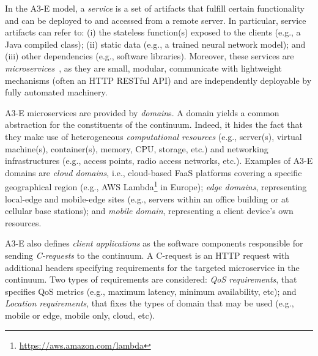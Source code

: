 In the A3-E model, a \textit{service} is a set of artifacts that fulfill certain functionality and can be deployed to and accessed from a remote server. In particular, service artifacts can refer to: (i) the stateless function(s) exposed to the clients (e.g., a Java compiled class); (ii) static data (e.g., a trained neural network model); and (iii) other dependencies (e.g.,  software libraries). Moreover, these services are \textit{microservices}~\cite{lewis2014microservices}, as they are small, modular, communicate with lightweight mechanisms (often an HTTP RESTful API) and are independently deployable by fully automated machinery. 

A3-E microservices are provided by \textit{domain}s. A domain yields a common abstraction for the constituents of the continuum. Indeed, it hides the fact that they make use of heterogeneous \textit{computational resources} (e.g., server(s), virtual machine(s), container(s), memory, CPU, storage, etc.) and networking infrastructures (e.g., access points, radio access networks, etc.). Examples of A3-E domains are \textit{cloud domains}, i.e., cloud-based FaaS platforms covering a specific geographical region (e.g., AWS Lambda\footnote{\url{https://aws.amazon.com/lambda}} in Europe); \textit{edge domains}, representing local-edge and mobile-edge sites (e.g., servers within an office building or at cellular base stations); and \textit{mobile domain}, representing a client device's own resources.


A3-E also defines \textit{client applications} as the software components responsible for sending \textit{C-requests} to the continuum. A C-request is an HTTP request with additional headers specifying requirements for the targeted microservice in the continuum. Two types of requirements are considered: \textit{QoS requirements}, that specifies QoS metrics (e.g., maximum latency, minimum availability, etc); and \textit{Location requirements}, that fixes the types of domain that may be used (e.g., mobile or edge, mobile only, cloud, etc). 



